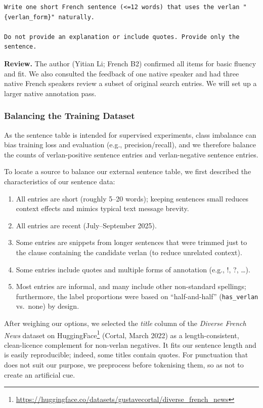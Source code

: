 \documentclass[12pt]{article}
\begin{document}
\begin{lstlisting}
Write one short French sentence (<=12 words) that uses the verlan "{verlan_form}" naturally.

Do not provide an explanation or include quotes. Provide only the sentence.
\end{lstlisting}

\textbf{Review.} The author (Yitian Li; French B2) confirmed all items for basic fluency and fit. We also consulted the feedback of one native speaker and had three native French speakers review a subset of original search entries. We will set up a larger native annotation pass.

\subsubsection{Balancing the Training Dataset}

As the sentence table is intended for supervised experiments, class imbalance can bias training loss and evaluation (e.g., precision/recall), and we therefore balance the counts of verlan-positive sentence entries and verlan-negative sentence entries.

To locate a source to balance our external sentence table, we first described the characteristics of our sentence data:
\begin{enumerate}
  \item All entries are short (roughly 5--20 words); keeping sentences small reduces context effects and mimics typical text message brevity.
  \item All entries are recent (July--September 2025).
  \item Some entries are snippets from longer sentences that were trimmed just to the clause containing the candidate verlan (to reduce unrelated context).
  \item Some entries include quotes and multiple forms of annotation (e.g., !, ?, \ldots).
  \item Most entries are informal, and many include other non-standard spellings; furthermore, the label proportions were based on ``half-and-half'' (\texttt{has\_verlan} vs.\ none) by design.
\end{enumerate}

After weighing our options, we selected the \textit{title} column of the \textit{Diverse French News} dataset on HuggingFace\footnote{\url{https://huggingface.co/datasets/gustavecortal/diverse_french_news}} (Cortal, March 2022) as a length-consistent, clean-licence complement for non-verlan negatives. It fits our sentence length and is easily reproducible; indeed, some titles contain quotes. For punctuation that does not suit our purpose, we preprocess before tokenising them, so as not to create an artificial cue.
\end{document}
